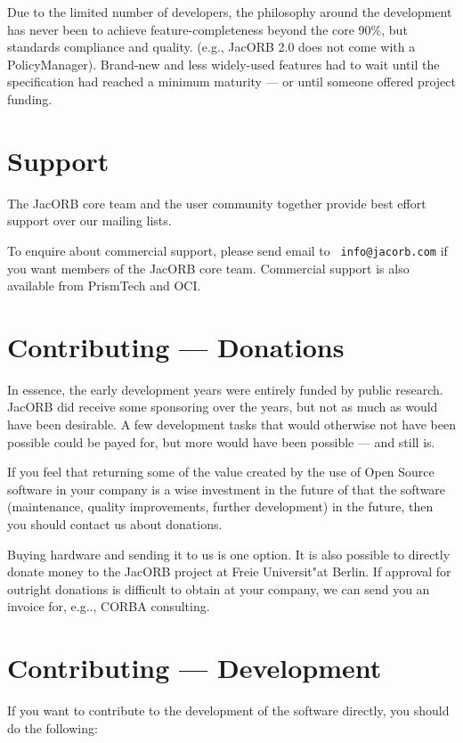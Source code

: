 Due to the limited number of developers, the philosophy around the
development has never been to achieve feature-completeness beyond the
core 90\%, but standards compliance and quality.  (e.g., JacORB 2.0
does not come with a PolicyManager).  Brand-new and less widely-used
features had to wait until the specification had reached a minimum
maturity --- or until someone offered project funding.

\section{Support}

The JacORB core team and the user community together provide best
effort support over our mailing lists. 

To enquire about commercial support, please send email to {\tt
  info@jacorb.com} if you want members of the JacORB core team.
Commercial support is also available from PrismTech and OCI.

\section{Contributing --- Donations}

In essence, the early development years were entirely funded by public
research. JacORB did receive some sponsoring over the years, but not
as much as would have been desirable. A few development tasks that
would otherwise not have been possible could be payed for, but more
would have been possible --- and still is. 

If you feel that returning some of the value created by the use of
Open Source software in your company is a wise investment in the
future of that the software (maintenance, quality improvements,
further development) in the future, then you should contact us about
donations.

Buying hardware and sending it to us is one option. It is also
possible to directly donate money to the JacORB project at Freie
Universit"at Berlin. If approval for outright donations is
difficult to obtain at your company, we can send you an invoice for,
e.g.., CORBA consulting.

\section{Contributing --- Development}

If you want to contribute to the development of the software directly,
you should do the following:

